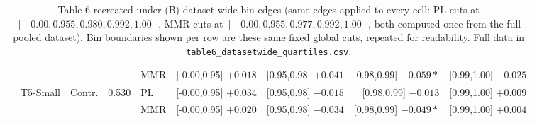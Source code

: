 \documentclass[10pt]{article}
\begin{document}
\begin{table}[p]
\begin{tabular}{@{}lllrlrrrr@{}}
 &  &  &  & MMR & [-0.00,0.95] $+0.018$ & [0.95,0.98] $+0.041$ & [0.98,0.99] $-0.059*$ & [0.99,1.00] $-0.025$ \\
\cmidrule(lr){1-9}
 & \multirow{2}{*}{T5-Small} & \multirow{2}{*}{Contr.} & \multirow{2}{*}{0.530} & PL & [-0.00,0.95] $+0.034$ & [0.95,0.98] $-0.015$ & [0.98,0.99] $-0.013$ & [0.99,1.00] $+0.009$ \\
 &  &  &  & MMR & [-0.00,0.95] $+0.020$ & [0.95,0.98] $-0.034$ & [0.98,0.99] $-0.049*$ & [0.99,1.00] $+0.004$ \\
\bottomrule
\end{tabular}
\caption{Table 6 recreated under (B) dataset-wide bin edges (same edges applied to
every cell: PL cuts at $[{-}0.00, 0.955, 0.980, 0.992, 1.00]$, MMR cuts at
$[{-}0.00, 0.955, 0.977, 0.992, 1.00]$, both computed once from the full pooled
dataset). Bin boundaries shown per row are these same fixed global cuts, repeated
for readability. Full data in \texttt{table6\_datasetwide\_quartiles.csv}.}
\label{tab:table6-B}
\end{table}
\end{document}
